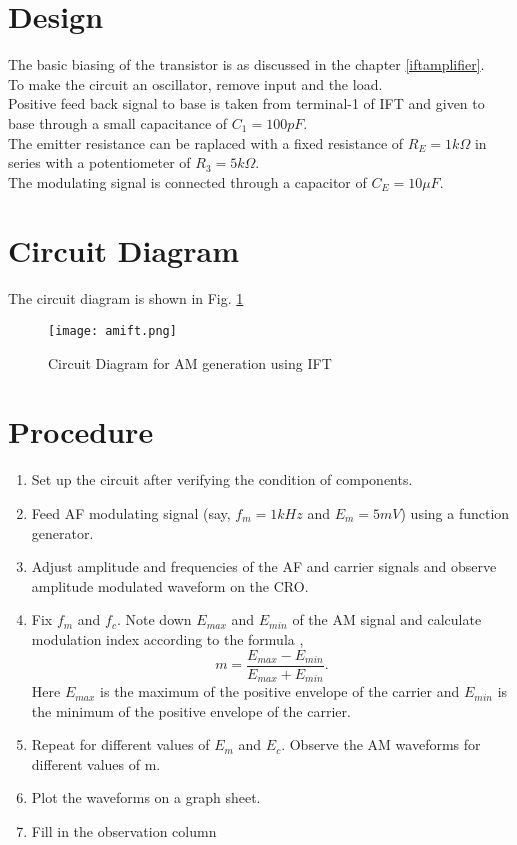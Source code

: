 \section*{Design}
The basic biasing of the transistor is as discussed in the chapter \ref{iftamplifier}.\\
To make the circuit an oscillator, remove input and the load.\\
Positive feed back signal to base is taken from terminal-1 of IFT and given to base through a small capacitance of $C_1=100 pF$. \\
The emitter resistance can be raplaced with a fixed resistance of $R_E=1k\Omega$ in series with a potentiometer of $R_3=5k\Omega$.\\
The modulating signal is connected through a capacitor of $C_E=10\mu F$.
\section*{Circuit Diagram}
The circuit diagram is shown in Fig. \ref{amiftpng}
\begin{figure}
\texttt{[image: amift.png]}
\caption{Circuit Diagram for AM generation using IFT}
\label{amiftpng}
\end{figure}
\section*{Procedure}

\begin{enumerate}
\item
Set up the circuit after verifying the condition of components.
\item
Feed AF modulating signal (say, $f_m=1kHz$ and $E_m=5mV$) using a function generator.
\item
Adjust amplitude and frequencies of the AF and carrier signals and observe amplitude modulated waveform on the CRO.
\item
Fix $f_m$ and $f_c$. Note down $E_{max}$ and $E_{min}$ of the AM signal and calculate modulation index according to the formula ,
\begin{equation}
m=\frac{E_{max}-E_{min}}{E_{max}+E_{min}}.
\end{equation}
Here $E_{max}$ is the maximum of the positive envelope of the carrier and $E_{min}$ is the minimum of the positive envelope of the carrier.
\item
Repeat for different values of $E_m$ and $E_c$. Observe the AM waveforms for different values of m.
\item
Plot the waveforms on a graph sheet.
\item

Fill in the observation column
\end{enumerate}


